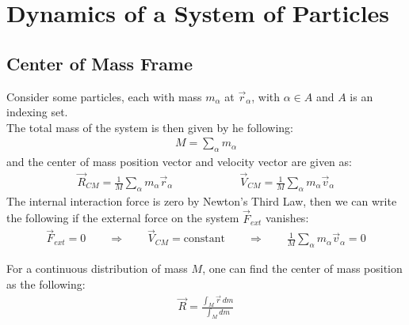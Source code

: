 \documentclass[11pt,oneside]{book}
\theoremstyle{break}
\theoremstyle{break}
\begin{document}
\newpage
\chapter{Dynamics of a System of Particles}
\section[Center of Mass Frame]{\color{red}Center of Mass Frame\color{black}}
Consider some particles, each with mass $m_{\alpha}$ at $\vec{r}_{\alpha}$, with $\alpha \in A$ and $A$ is an indexing set. \\
The total mass of the system is then given by he following:
\begin{align*}
M = \sum_{\alpha}m_{\alpha}
\end{align*}
and the center of mass position vector and velocity vector are given as:
\begin{align*}
\vec{R}_{CM} = \frac{1}{M}\sum_{\alpha}m_{\alpha} \vec{r}_{\alpha}\qquad\qquad\qquad \vec{V}_{CM} = \frac{1}{M}\sum_{\alpha}m_{\alpha}\vec{v}_{\alpha}
\end{align*}
The internal interaction force is zero by Newton's Third Law, then we can write the following if the external force on the system $\vec{F}_{ext} $ vanishes:
\begin{align*}
\vec{F}_{ext} = 0 \qquad \Rightarrow\qquad \vec{V}_{CM} = \text{constant} \qquad \Rightarrow \qquad \frac{1}{M}\sum_{\alpha}m_{\alpha}\vec{v}_{\alpha} = 0
\end{align*}

For a continuous distribution of mass $M$, one can find the center of mass position as the following:
\begin{align*}
\vec{R} = \frac{\int_M \vec{r}\, dm}{\int_M dm}
\end{align*}
\end{document}
